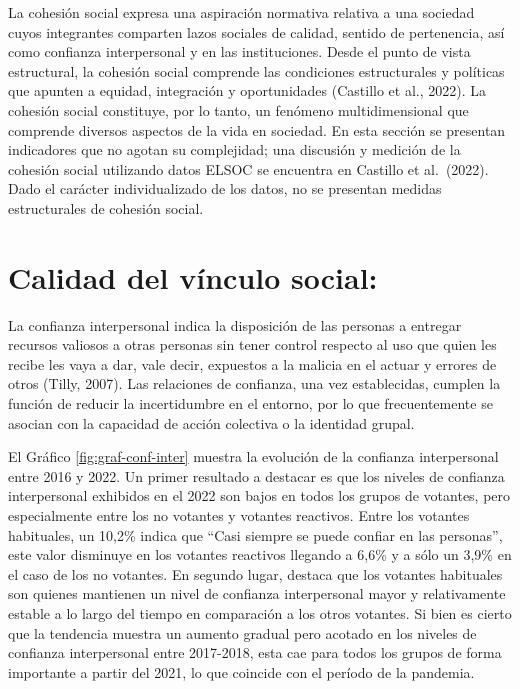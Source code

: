 \documentclass[
  12pt,
]{book}
\begin{document}
La cohesión social expresa una aspiración normativa relativa a una sociedad cuyos integrantes comparten lazos sociales de calidad, sentido de pertenencia, así como confianza interpersonal y en las instituciones. Desde el punto de vista estructural, la cohesión social comprende las condiciones estructurales y políticas que apunten a equidad, integración y oportunidades (Castillo et al., 2022). La cohesión social constituye, por lo tanto, un fenómeno multidimensional que comprende diversos aspectos de la vida en sociedad. En esta sección se presentan indicadores que no agotan su complejidad; una discusión y medición de la cohesión social utilizando datos ELSOC se encuentra en Castillo et al.~(2022). Dado el carácter individualizado de los datos, no se presentan medidas estructurales de cohesión social.

\hypertarget{calidad-del-vuxednculo-social}{%
\section{Calidad del vínculo social:}\label{calidad-del-vuxednculo-social}}

La confianza interpersonal indica la disposición de las personas a entregar recursos valiosos a otras personas sin tener control respecto al uso que quien les recibe les vaya a dar, vale decir, expuestos a la malicia en el actuar y errores de otros (Tilly, 2007). Las relaciones de confianza, una vez establecidas, cumplen la función de reducir la incertidumbre en el entorno, por lo que frecuentemente se asocian con la capacidad de acción colectiva o la identidad grupal.

El Gráfico \ref{fig:graf-conf-inter} muestra la evolución de la confianza interpersonal entre 2016 y 2022. Un primer resultado a destacar es que los niveles de confianza interpersonal exhibidos en el 2022 son bajos en todos los grupos de votantes, pero especialmente entre los no votantes y votantes reactivos. Entre los votantes habituales, un 10,2\% indica que ``Casi siempre se puede confiar en las personas'', este valor disminuye en los votantes reactivos llegando a 6,6\% y a sólo un 3,9\% en el caso de los no votantes. En segundo lugar, destaca que los votantes habituales son quienes mantienen un nivel de confianza interpersonal mayor y relativamente estable a lo largo del tiempo en comparación a los otros votantes. Si bien es cierto que la tendencia muestra un aumento gradual pero acotado en los niveles de confianza interpersonal entre 2017-2018, esta cae para todos los grupos de forma importante a partir del 2021, lo que coincide con el período de la pandemia.
\end{document}
